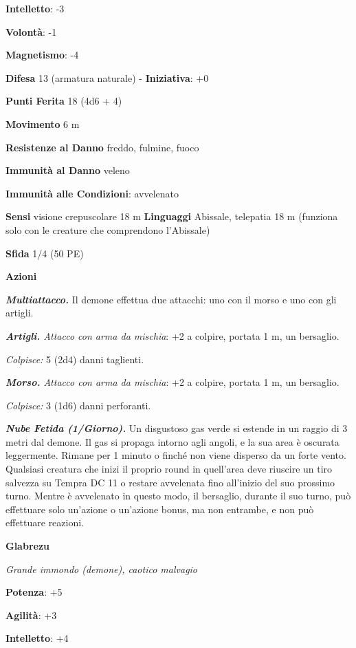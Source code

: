 \begin{multicols}{2}
\textbf{Intelletto}: -3

\textbf{Volontà}: -1

\textbf{Magnetismo}: -4

\textbf{Difesa} 13 (armatura naturale) - \textbf{Iniziativa}: +0

\textbf{Punti Ferita} 18 (4d6 + 4)

\textbf{Movimento} 6 m

\textbf{Resistenze al Danno} freddo, fulmine, fuoco

\textbf{Immunità al Danno} veleno

\textbf{Immunità alle Condizioni}: avvelenato

\textbf{Sensi} visione crepuscolare 18 m
\textbf{Linguaggi} Abissale, telepatia 18 m (funziona solo con le
creature che comprendono l'Abissale)

\textbf{Sfida} 1/4 (50 PE)\smallskip

\smallskip\textbf{Azioni}

\emph{\textbf{Multiattacco.}} Il demone effettua due attacchi: uno con
il morso e uno con gli artigli.

\emph{\textbf{Artigli.} Attacco con arma da mischia}: +2 a colpire,
portata 1 m, un bersaglio.

\emph{Colpisce:} 5 (2d4) danni taglienti.

\emph{\textbf{Morso.} Attacco con arma da mischia}: +2 a colpire,
portata 1 m, un bersaglio.

\emph{Colpisce:} 3 (1d6) danni perforanti.

\emph{\textbf{Nube Fetida (1/Giorno).}} Un disgustoso gas verde si
estende in un raggio di 3 metri dal demone. Il gas si propaga intorno
agli angoli, e la sua area è oscurata leggermente. Rimane per 1 minuto o
finché non viene disperso da un forte vento. Qualsiasi creatura che
inizi il proprio round in quell'area deve riuscire un tiro salvezza su Tempra DC 11 o restare avvelenata fino all'inizio del suo prossimo
turno. Mentre è avvelenato in questo modo, il bersaglio, durante il suo
turno, può effettuare solo un'azione o un'azione bonus, ma non entrambe,
e non può effettuare reazioni.



\textbf{Glabrezu}

\emph{Grande immondo (demone), caotico malvagio}

\textbf{Potenza}: +5

\textbf{Agilità}: +3

\textbf{Intelletto}: +4


\end{multicols}
